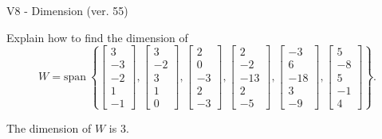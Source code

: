 \begin{exercise}
  \begin{exerciseTitle}V8 - Dimension (ver. 55)\end{exerciseTitle}
  \begin{exerciseStatement}
    Explain how to find the dimension of 
\[W=\mathrm{span}\ \left\{\left[\begin{array}{r}
3 \\
-3 \\
-2 \\
1 \\
-1
\end{array}\right] , \left[\begin{array}{r}
3 \\
-2 \\
3 \\
1 \\
0
\end{array}\right] , \left[\begin{array}{r}
2 \\
0 \\
-3 \\
2 \\
-3
\end{array}\right] , \left[\begin{array}{r}
2 \\
-2 \\
-13 \\
2 \\
-5
\end{array}\right] , \left[\begin{array}{r}
-3 \\
6 \\
-18 \\
3 \\
-9
\end{array}\right] , \left[\begin{array}{r}
5 \\
-8 \\
5 \\
-1 \\
4
\end{array}\right]\right\}.\]



  \end{exerciseStatement}
  \begin{exerciseAnswer}
   The dimension of \(W\) is  \(3\).
  


  \end{exerciseAnswer}
\end{exercise}